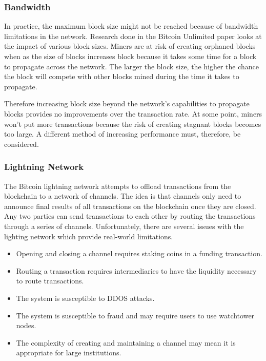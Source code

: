 \documentclass{article}
\begin{document}
\subsubsection{Bandwidth}

In practice, the maximum block size might not be reached because of bandwidth limitations
in the network.  Research done in the Bitcoin Unlimited paper \cite{bitcoinunlimited} looks
at the impact of various block sizes.  Miners are at risk of creating orphaned blocks 
when as the size of blocks increases block because it takes some time for a block to propagate
across the network.  The larger the block size, the higher the chance the block will
compete with other blocks mined during the time it takes to propagate.

Therefore increasing block size beyond the network's capabilities to propagate blocks
provides no improvements over the transaction rate.  At some point, miners won't put more
transactions because the risk of creating stagnant blocks becomes too large.  A 
different method of increasing performance must, therefore, be considered.

\subsubsection{Lightning Network}

The Bitcoin lightning network attempts to offload transactions from the blockchain
to a network of channels.  The idea is that channels only need to announce final
results of all transactions on the blockchain once they are closed.  Any two parties
can send transactions to each other by routing the transactions through a series of
channels.  Unfortunately, there are several issues with the lighting network which
provide real-world limitations.

\begin{itemize}
    \item Opening and closing a channel requires staking coins in a funding transaction.
    \item Routing a transaction requires intermediaries to have the liquidity necessary
        to route transactions.
    \item The system is susceptible to DDOS attacks.
    \item The system is susceptible to fraud and may require users to use watchtower 
        nodes.
    \item The complexity of creating and maintaining a channel may mean it is appropriate for large institutions.
\end{itemize}
\end{document}
